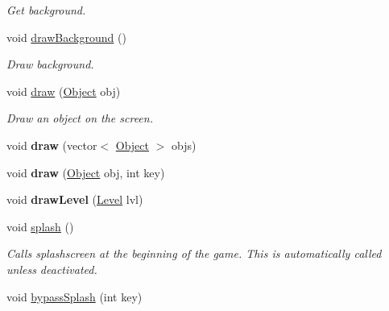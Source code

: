 \begin{DoxyCompactItemize}
\begin{DoxyCompactList}\small\item\em Get background. \end{DoxyCompactList}\item 
void \hyperlink{classEngine_aa84c13e84d00fd3b0389a9a076ec194f}{draw\+Background} ()\hypertarget{classEngine_aa84c13e84d00fd3b0389a9a076ec194f}{}\label{classEngine_aa84c13e84d00fd3b0389a9a076ec194f}

\begin{DoxyCompactList}\small\item\em Draw background. \end{DoxyCompactList}\item 
void \hyperlink{classEngine_a276e63ae5648c36051c21c5b7c5dfb4b}{draw} (\hyperlink{classObject}{Object} obj)\hypertarget{classEngine_a276e63ae5648c36051c21c5b7c5dfb4b}{}\label{classEngine_a276e63ae5648c36051c21c5b7c5dfb4b}

\begin{DoxyCompactList}\small\item\em Draw an object on the screen. \end{DoxyCompactList}\item 
void {\bfseries draw} (vector$<$ \hyperlink{classObject}{Object} $>$ objs)\hypertarget{classEngine_a212b1b788cae7931fda927c0cbd2e165}{}\label{classEngine_a212b1b788cae7931fda927c0cbd2e165}

\item 
void {\bfseries draw} (\hyperlink{classObject}{Object} obj, int key)\hypertarget{classEngine_a81d89df09ee2577fd7deaf2f5e27f93a}{}\label{classEngine_a81d89df09ee2577fd7deaf2f5e27f93a}

\item 
void {\bfseries draw\+Level} (\hyperlink{classLevel}{Level} lvl)\hypertarget{classEngine_aa2eff336a5e306177bdc43c229aeff62}{}\label{classEngine_aa2eff336a5e306177bdc43c229aeff62}

\item 
void \hyperlink{classEngine_adb6f1426c5c57f9d60be1e10d8eb2506}{splash} ()\hypertarget{classEngine_adb6f1426c5c57f9d60be1e10d8eb2506}{}\label{classEngine_adb6f1426c5c57f9d60be1e10d8eb2506}

\begin{DoxyCompactList}\small\item\em Calls splashscreen at the beginning of the game. This is automatically called unless deactivated. \end{DoxyCompactList}\item 
void \hyperlink{classEngine_a3b9cf8a050f43e4e185748f7b2a3ded8}{bypass\+Splash} (int key)\hypertarget{classEngine_a3b9cf8a050f43e4e185748f7b2a3ded8}{}\label{classEngine_a3b9cf8a050f43e4e185748f7b2a3ded8}


\end{DoxyCompactItemize}
